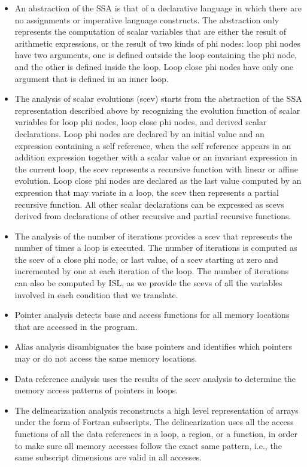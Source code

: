 \documentclass{sigplanconf}
\begin{document}
\begin{itemize}
\item An abstraction of the SSA is that of a declarative language
  \cite{spop2007} in which there are no assignments or imperative language
  constructs.  The abstraction only represents the computation of scalar
  variables that are either the result of arithmetic expressions, or the result
  of two kinds of phi nodes: loop phi nodes have two arguments, one is defined
  outside the loop containing the phi node, and the other is defined inside the
  loop.  Loop close phi nodes have only one argument that is defined in an inner
  loop.

\item The analysis of scalar evolutions (scev) \cite{scev} starts from the
  abstraction of the SSA representation described above by recognizing the
  evolution function of scalar variables for loop phi nodes, loop close phi
  nodes, and derived scalar declarations.  Loop phi nodes are declared by an
  initial value and an expression containing a self reference, when the self
  reference appears in an addition expression together with a scalar value or an
  invariant expression in the current loop, the scev represents a recursive
  function with linear or affine evolution.  Loop close phi nodes are declared
  as the last value computed by an expression that may variate in a loop, the
  scev then represents a partial recursive function.  All other scalar
  declarations can be expressed as scevs derived from declarations of other
  recursive and partial recursive functions.

\item The analysis of the number of iterations \cite{scev} provides a scev that
  represents the number of times a loop is executed.  The number of iterations
  is computed as the scev of a close phi node, or last value, of a scev starting
  at zero and incremented by one at each iteration of the loop.  The number of
  iterations can also be computed by ISL, as we provide the scevs of all the
  variables involved in each condition that we translate.

\item Pointer analysis detects base and access functions for all memory
  locations that are accessed in the program.

\item Alias analysis disambiguates the base pointers and identifies which
  pointers may or do not access the same memory locations.

\item Data reference analysis uses the results of the scev analysis to determine
  the memory access patterns of pointers in loops.

\item The delinearization analysis \cite{delinearization1, delinearization2}
  reconstructs a high level representation of arrays under the form of Fortran
  subscripts.  The delinearization uses all the access functions of all the data
  references in a loop, a region, or a function, in order to make sure all
  memory accesses follow the exact same pattern, i.e., the same subscript
  dimensions are valid in all accesses.
\end{itemize}
\end{document}
